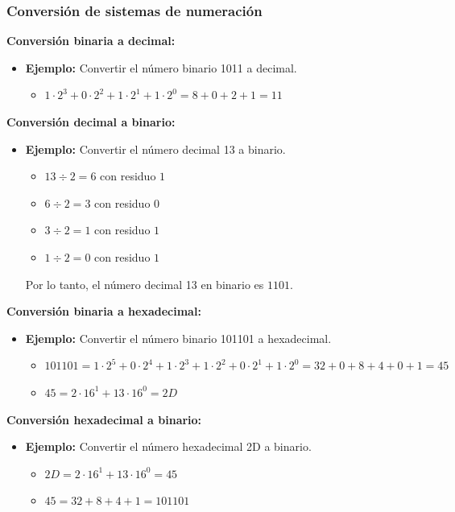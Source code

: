 \documentclass{templateNote}
\begin{document}
\subsubsection{Conversión de sistemas de numeración}
\textbf{Conversión binaria a decimal:}
\begin{itemize}
    \item \textbf{Ejemplo:} Convertir el número binario 1011 a decimal.
    \begin{itemize}
        \item $1 \cdot 2^3 + 0 \cdot 2^2 + 1 \cdot 2^1 + 1 \cdot 2^0 = 8 + 0 + 2 + 1 = 11$
    \end{itemize}
\end{itemize}
\textbf{Conversión decimal a binario:}
\begin{itemize}
    \item \textbf{Ejemplo:} Convertir el número decimal 13 a binario.
        \begin{itemize}
            \item $13 \div 2 = 6$ con residuo $1$
            \item $6 \div 2 = 3$ con residuo $0$
            \item $3 \div 2 = 1$ con residuo $1$
            \item $1 \div 2 = 0$ con residuo $1$
        \end{itemize}
    Por lo tanto, el número decimal 13 en binario es $1101$.
\end{itemize}
\textbf{Conversión binaria a hexadecimal:}
\begin{itemize}
    \item \textbf{Ejemplo:} Convertir el número binario 101101 a hexadecimal.
    \begin{itemize}
        \item $101101 = 1 \cdot 2^5 + 0 \cdot 2^4 + 1 \cdot 2^3 + 1 \cdot 2^2 + 0 \cdot 2^1 + 1 \cdot 2^0 = 32 + 0 + 8 + 4 + 0 + 1 = 45$
        \item $45 = 2 \cdot 16^1 + 13 \cdot 16^0 = 2D$
    \end{itemize}
\end{itemize}
\textbf{Conversión hexadecimal a binario:}
\begin{itemize}
    \item \textbf{Ejemplo:} Convertir el número hexadecimal 2D a binario.
    \begin{itemize}
        \item $2D = 2 \cdot 16^1 + 13 \cdot 16^0 = 45$
        \item $45 = 32 + 8 + 4 + 1 = 101101$
    \end{itemize}
\end{itemize}
\end{document}
